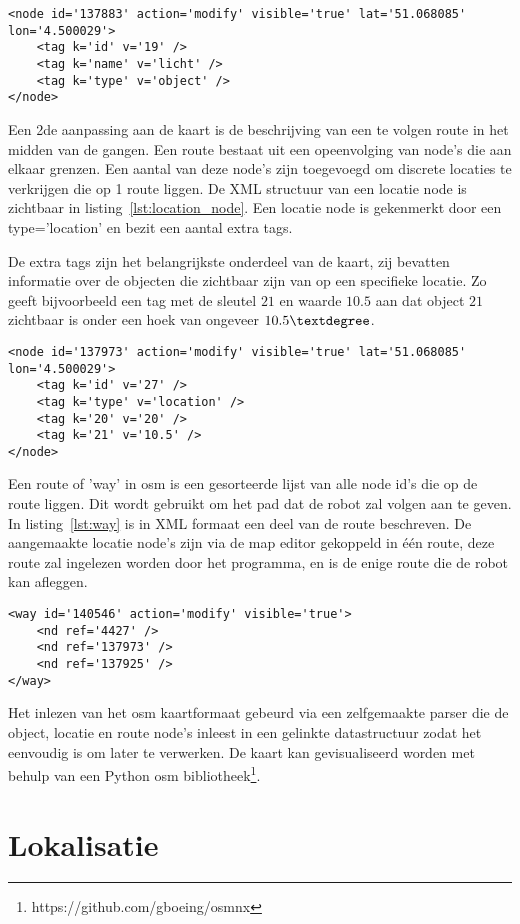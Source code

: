 \begin{lstlisting}[basicstyle=\small]
<node id='137883' action='modify' visible='true' lat='51.068085' lon='4.500029'>
    <tag k='id' v='19' />
    <tag k='name' v='licht' />
    <tag k='type' v='object' />
</node>
\end{lstlisting}

Een 2de aanpassing aan de kaart is de beschrijving van een te volgen route in het midden van de gangen.
Een route bestaat uit een opeenvolging van node's die aan elkaar grenzen.
Een aantal van deze node's zijn toegevoegd om discrete locaties te verkrijgen die op 1 route liggen.
De XML structuur van een locatie node is zichtbaar in listing~\ref{lst:location_node}.
Een locatie node is gekenmerkt door een type='location' en bezit een aantal extra tags.

De extra tags zijn het belangrijkste onderdeel van de kaart, zij bevatten informatie over de objecten die zichtbaar zijn van op een specifieke locatie.
Zo geeft bijvoorbeeld een tag met de sleutel $21$ en waarde $10.5$ aan dat object $21$ zichtbaar is onder een hoek van ongeveer $10.5\textdegree$.

\begin{lstlisting}[basicstyle=\small]
<node id='137973' action='modify' visible='true' lat='51.068085' lon='4.500029'>
    <tag k='id' v='27' />
    <tag k='type' v='location' />
    <tag k='20' v='20' />
    <tag k='21' v='10.5' />
</node>
\end{lstlisting}

Een route of 'way' in \gls{osm} is een gesorteerde lijst van alle node id's die op de route liggen. Dit wordt gebruikt om het pad dat de robot zal volgen aan te geven.
In listing~\ref{lst:way} is in XML formaat een deel van de route beschreven.
De aangemaakte locatie node's zijn via de map editor gekoppeld in \'{e}\'{e}n route, deze route zal ingelezen worden door het programma, en is de enige route die de robot kan afleggen.

\begin{lstlisting}[basicstyle=\small]
<way id='140546' action='modify' visible='true'>
    <nd ref='4427' />
    <nd ref='137973' />
    <nd ref='137925' />
</way>
\end{lstlisting}

Het inlezen van het \gls{osm} kaartformaat gebeurd via een zelfgemaakte parser die de object, locatie en route node's inleest in een gelinkte datastructuur
zodat het eenvoudig is om later te verwerken.
De kaart kan gevisualiseerd worden met behulp van een Python \gls{osm} bibliotheek\footnote{https://github.com/gboeing/osmnx}.

\section{Lokalisatie}\label{sec:lokalisatie}